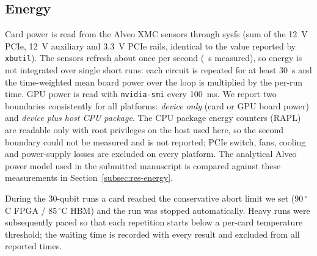 \subsection{Energy}\label{subsec:energy-method}

Card power is read from the Alveo XMC sensors through sysfs (sum of the 12~V PCIe, 12~V auxiliary and 3.3~V PCIe rails, identical to the value reported by \texttt{xbutil}). The sensors refresh about once per second (\NumXmcPeriod~s measured), so energy is not integrated over single short runs: each circuit is repeated for at least 30~s and the time-weighted mean board power over the loop is multiplied by the per-run time. GPU power is read with \texttt{nvidia-smi} every 100~ms. We report two boundaries consistently for all platforms: \emph{device only} (card or GPU board power) and \emph{device plus host CPU package}. The CPU package energy counters (RAPL) are readable only with root privileges on the host used here, so the second boundary could not be measured and is not reported; PCIe switch, fans, cooling and power-supply losses are excluded on every platform. The analytical Alveo power model used in the submitted manuscript is compared against these measurements in Section~\ref{subsec:res-energy}.

During the 30-qubit runs a card reached the conservative abort limit we set (90\,$^\circ$C FPGA / 85\,$^\circ$C HBM) and the run was stopped automatically. Heavy runs were subsequently paced so that each repetition starts below a per-card temperature threshold; the waiting time is recorded with every result and excluded from all reported times.
